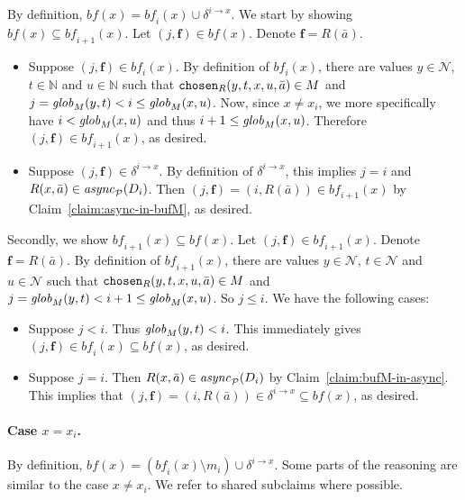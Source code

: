 \documentclass{tlp}
\newcommand{\Nat}{\mathbb{N}}  \newcommand{\len}[1]{|#1|} \newcommand{\rom}[1]{\text{\emph{(#1)}}} \newcommand{\romI}{\rom i}
\newcommand{\ded}{\mathcal{P}}
\newcommand{\fc}{\boldsymbol{f}}
\newcommand{\nw}{\mathcal{N}}
\newcommand{\chosen}{\pred{chosen}}
\newcommand{\cnfb}{\mathit{bf}}
\newcommand{\pair}[2]{(#1,#2)}
\newcommand{\sendto}[2]{\delta^{#1\to#2}}
\newcommand{\async}[1]{\fname{async}_{#1}}
\newcommand{\mstep}[1]{(#1)}
\newcommand{\globM}[1]{\fname{glob}_{M}(#1)}
\begin{document}
\begin{appendix}
By definition, $\cnfb(x)=\cnfb_{i}(x)\cup\sendto ix$. We start by
showing $\cnfb(x)\subseteq\cnfb_{i+1}(x)$. Let $\pair j{\fc}\in\cnfb(x)$.
Denote $\fc=R(\bar{a})$. 
\begin{itemize}
\item Suppose $\pair j{\fc}\in\cnfb_{i}(x)$. By definition of $\cnfb_{i}(x)$,
there are values $y\in\nw$, $t\in\Nat$ and $u\in\Nat$ such that
$\chosen_{R}(y,t,x,u,\bar{a})\in M$ and $j=\globM{y,t}<i\leq\globM{x,u}$.
Now, since $x\neq x_{i}$, we more specifically have $i<\globM{x,u}$
and thus $i+1\leq\globM{x,u}$. Therefore $\pair j{\fc}\in\cnfb_{i+1}(x)$,
as desired.
\item Suppose $\pair j{\fc}\in\sendto ix$. By definition of $\sendto ix$,
this implies $j=i$ and $R(x,\bar{a})\in\async{\ded}\mstep{D_{i}}$.
Then $\pair j{\fc}=\pair i{R(\bar{a})}\in\cnfb_{i+1}(x)$ by Claim~\ref{claim:async-in-bufM},
as desired.
\end{itemize}
Secondly, we show $\cnfb_{i+1}(x)\subseteq\cnfb(x)$. Let $\pair j{\fc}\in\cnfb_{i+1}(x)$.
Denote $\fc=R(\bar{a})$. By definition of $\cnfb_{i+1}(x)$, there
are values $y\in\nw$, $t\in\nw$ and $u\in\nw$ such that $\chosen_{R}(y,t,x,u,\bar{a})\in M$
and $j=\globM{y,t}<i+1\leq\globM{x,u}$. So $j\leq i$. We have the
following cases:
\begin{itemize}
\item Suppose $j<i$. Thus $\globM{y,t}<i$. This immediately gives $\pair j{\fc}\in\cnfb_{i}(x)\subseteq\cnfb(x)$,
as desired.
\item Suppose $j=i$. Then $R(x,\bar{a})\in\async{\ded}\mstep{D_{i}}$ by
Claim~\ref{claim:bufM-in-async}. This implies that $\pair j{\fc}=\pair i{R(\bar{a})}\in\sendto ix\subseteq\cnfb(x)$,
as desired.
\end{itemize}

\paragraph*{Case $x=x_{i}$.}

By definition, $\cnfb(x)=(\cnfb_{i}(x)\setminus m_{i})\cup\sendto ix$.
Some parts of the reasoning are similar to the case $x\neq x_{i}$.
We refer to shared subclaims where possible. 


\end{appendix}
\end{document}

